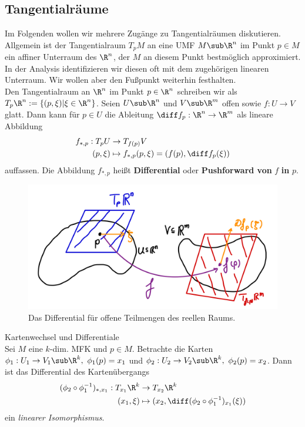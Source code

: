 \subsection{Tangentialräume}
\label{subsec:tangentspace}
Im Folgenden wollen wir mehrere Zugänge zu Tangentialräumen diskutieren.\\
Allgemein ist der Tangentialraum $T_pM$ an eine UMF $M \sub \R^n$ im Punkt $p \in M$ ein affiner Unterraum des $\R^n$, der $M$ an diesem Punkt bestmöglich approximiert. In der Analysis identifizieren wir diesen oft mit dem zugehörigen linearen Unterraum. Wir wollen aber den Fußpunkt weiterhin festhalten. \\
Den Tangentialraum an $\R^n$ im Punkt $p \in \R^n$ schreiben wir als $T_p\R^n := \{(p, \xi) | \xi \in \R^n \}$.
Seien $U \sub \R^n$ und $V \sub \R^m$ offen sowie $f: U \to V$ glatt. Dann kann für $p \in U$ die Ableitung $\diff f_p: \R^n \to \R^m$ als lineare Abbildung
\begin{align}
f_{\ast, p}: T_pU &\to T_{f(p)}V \\
(p, \xi) &\mapsto f_{\ast, p}(p, \xi) = (f(p), \diff f_p(\xi))
\end{align}
auffassen. Die Abbildung $f_{\ast, p}$ heißt \textbf{Differential} oder \textbf{Pushforward von} $f$ \textbf{in} $p$.
\begin{figure}[H]
\label{fig:sphere}
\centering
\includegraphics[width=0.3\linewidth]{Bilder/differentialrn.png}
\caption{Das Differential für offene Teilmengen des reellen Raums.}
\end{figure}
\begin{bemerkungen}Kartenwechsel und Differentiale\\
Sei $M$ eine $k$-dim. MFK und $p \in M$. Betrachte die Karten $\phi_1: U_1 \to V_1 \sub \R^k, \ \phi_1(p)=x_1$ und $\phi_2: U_2 \to V_2 \sub \R^k, \ \phi_2(p)=x_2$. Dann ist das Differential des Kartenübergangs
\begin{align}
(\phi_2 \circ \phi_1^{-1})_{\ast, x_1} : T_{x_1}\R^k &\to T_{x_2} \R^k\\
(x_1, \xi) &\mapsto (x_2, \diff (\phi_2 \circ \phi_1^{-1})_{x_1}(\xi))
\end{align}
ein \textit{linearer Isomorphismus}.
\end{bemerkungen}
